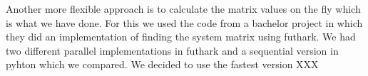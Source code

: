 Another more flexible approach is to calculate the matrix values on the fly which is what we have done. For this we used the code from a bachelor project in which they did an implementation of finding the system matrix using futhark. We had two different parallel implementations in futhark and a sequential version in pyhton which we compared. We decided to use the fastest version XXX \\

